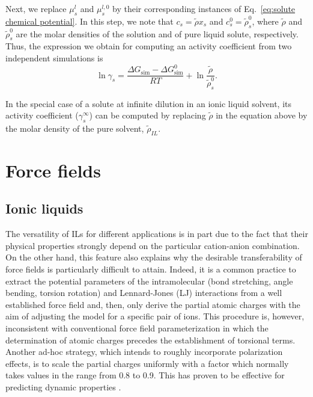 \documentclass[3p,twocolumn]{elsarticle}
\begin{document}
Next, we replace $\mu_s^l$ and $\mu_s^{l,0}$ by their corresponding instances of Eq.~\eqref{eq:solute chemical potential}. In this step, we note that $c_s = \tilde{\rho} x_s$ and $c_s^0 = \tilde{\rho}_s^0$, where $\tilde{\rho}$ and $\tilde{\rho}_s^0$ are the molar densities of the solution and of pure liquid solute, respectively. Thus, the expression we obtain for computing an activity coefficient from two independent simulations is
\begin{equation}
\label{eq:gamma}
\ln \gamma_s = \frac{\Delta G_\text{sim} - \Delta G_\text{sim}^{0}}{R T} + \ln \frac{\tilde{\rho}}{\tilde{\rho}_s^0}.
\end{equation}

In the special case of a solute at infinite dilution in an ionic liquid solvent, its activity coefficient ($\gamma^\infty_s$) can be computed by replacing $\tilde{\rho}$ in the equation above by the molar density of the pure solvent, $\tilde{\rho}_\textit{IL}$.

\section{Force fields}
\label{sec:force_field}

\subsection{Ionic liquids}
\label{sec:force_field_il}

The versatility of ILs for different applications is in part due to the fact that their physical properties strongly depend on the particular cation-anion combination.
On the other hand, this feature also explains why the desirable transferability of force fields is particularly difficult to attain.
Indeed, it is a common practice to extract the potential parameters of the intramolecular (bond stretching, angle bending, torsion rotation) and Lennard-Jones (LJ) interactions from a well established force field and, then, only derive the partial atomic charges with the aim of adjusting the model for a specific pair of ions.
This procedure is, however, inconsistent with conventional force field parameterization in which the determination of atomic charges precedes the establishment of torsional terms.
Another ad-hoc strategy, which intends to roughly incorporate polarization effects, is to scale the partial charges uniformly with a factor which normally takes values in the range from 0.8 to 0.9.
This has proven to be effective for predicting dynamic properties \cite{Schr_der_2012}.
\end{document}
